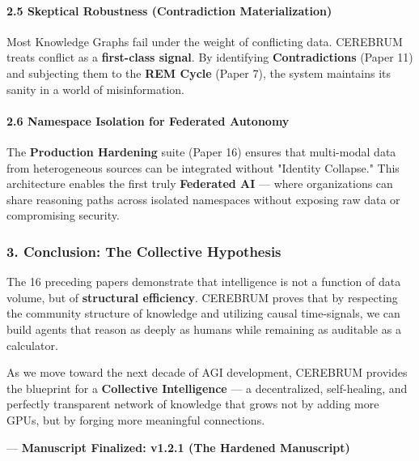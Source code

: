 \documentclass[10pt,journal,compsoc]{IEEEtran}
\begin{document}
\paragraph{2.5 Skeptical Robustness (Contra\-diction Materi\-alization)}
Most Knowledge Graphs fail under the weight of conflicting data. CEREBRUM treats conflict as a \textbf{first-class signal}. By identifying \textbf{Contra\-dictions} (Paper 11) and subjecting them to the \textbf{REM Cycle} (Paper 7), the system maintains its sanity in a world of misin\-formation.

\paragraph{2.6 Namespace Isolation for Federated Autonomy}
The \textbf{Production Hardening} suite (Paper 16) ensures that multi-modal data from heter\-ogeneous sources can be integrated without "Identity Collapse." This archi\-tecture enables the first truly \textbf{Federated AI} — where organ\-izations can share reasoning paths across isolated namespaces without exposing raw data or compr\-omising security.

\subsubsection{3. Conclusion: The Collective Hypothesis}
The 16 preceding papers demonstrate that intel\-ligence is not a function of data volume, but of \textbf{structural efficiency}. CEREBRUM proves that by respecting the community structure of knowledge and utilizing causal time-signals, we can build agents that reason as deeply as humans while remaining as auditable as a calculator. 

As we move toward the next decade of AGI development, CEREBRUM provides the blueprint for a \textbf{Collective Intell\-igence} — a decen\-tralized, self-healing, and perfectly transparent network of knowledge that grows not by adding more GPUs, but by forging more meaningful connections.

---
\textbf{Manuscript Finalized: v1.2.1 (The Hardened Manuscript)}




\end{document}
